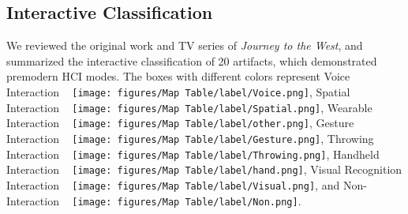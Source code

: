 {\color{red} \subsection{Interactive Classification}}
\label{appendix:b1}
We reviewed the original work and TV series of \textit{Journey to the West}, and summarized the interactive classification of 20 artifacts, which demonstrated premodern HCI modes. The boxes with different colors represent Voice Interaction ~ \texttt{[image: figures/Map Table/label/Voice.png]}, 
Spatial Interaction ~ \texttt{[image: figures/Map Table/label/Spatial.png]}, 
Wearable Interaction ~ \texttt{[image: figures/Map Table/label/other.png]}, 
Gesture Interaction ~ \texttt{[image: figures/Map Table/label/Gesture.png]}, Throwing Interaction ~ \texttt{[image: figures/Map Table/label/Throwing.png]}, Handheld Interaction ~ \texttt{[image: figures/Map Table/label/hand.png]}, Visual Recognition Interaction ~ \texttt{[image: figures/Map Table/label/Visual.png]}, and Non-Interaction ~ \texttt{[image: figures/Map Table/label/Non.png]}. 

